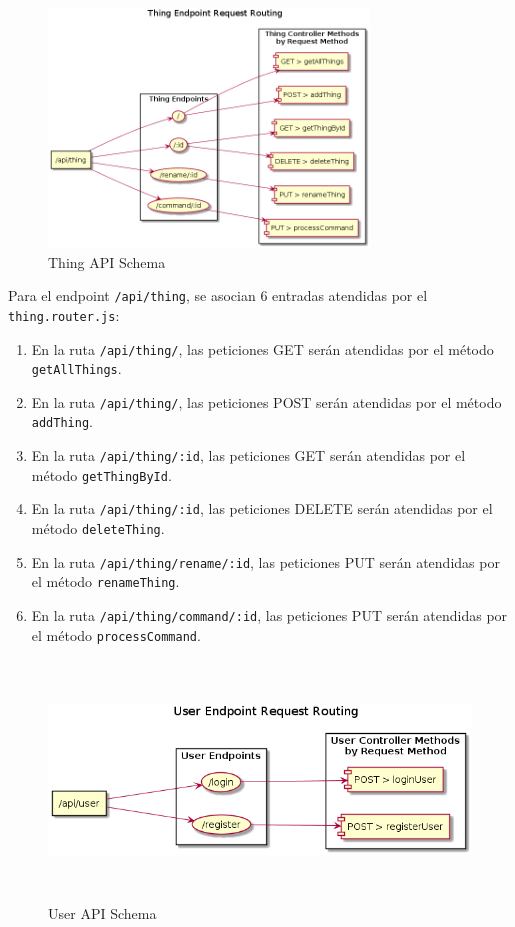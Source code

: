 \begin{figure}[hbt!]
\centering
\includegraphics[height=2.5in]{figures/diagrams/back/router-flow/thing-endpoints.png}
\caption[thing-endpoints]{Thing API Schema\footnotemark}
\end{figure}

Para el endpoint \verb|/api/thing|, se asocian 6 entradas atendidas por el \verb|thing.router.js|:
\begin{enumerate}
\item En la ruta \verb|/api/thing/|, las peticiones GET serán atendidas por el método \verb|getAllThings|.
\item En la ruta \verb|/api/thing/|, las peticiones POST serán atendidas por el método \verb|addThing|.
\item En la ruta \verb|/api/thing/:id|, las peticiones GET serán atendidas por el método \verb|getThingById|.
\item En la ruta \verb|/api/thing/:id|, las peticiones DELETE serán atendidas por el método \verb|deleteThing|.
\item En la ruta \verb|/api/thing/rename/:id|, las peticiones PUT serán atendidas por el método \verb|renameThing|.
\item En la ruta \verb|/api/thing/command/:id|, las peticiones PUT serán atendidas por el método \verb|processCommand|.
\end{enumerate}

\begin{figure}[hbt!]
\centering
\includegraphics[height=2.5in]{figures/diagrams/back/router-flow/user-endpoints.png}
\caption[user-endpoints]{User API Schema\footnotemark}
\end{figure}


